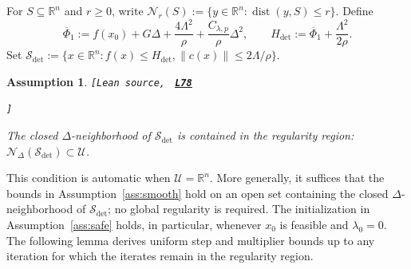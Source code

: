 \documentclass[11pt]{article}
\newtheorem{assumption}[theorem]{Assumption}
\theoremstyle{definition}
\theoremstyle{remark}
\numberwithin{equation}{section}
\numberwithin{figure}{section}
\numberwithin{table}{section}
\numberwithin{algorithm}{section}
\newcommand{\R}{\mathbb{R}}
\newcommand{\norm}[1]{\left\lVert #1\right\rVert}
\newcommand{\leanLinkText}[1]{%
  \underline{\textbf{#1}}%
}
\newcommand{\leanDeclTag}[2]{%
  {\footnotesize\texttt{[Lean source, }}%
  \href{https://github.com/optpku/ReasBook/blob/v4.32.2/ReasBook/Papers/TR_LALM_theory/#1?plain=1\#L#2}%
    {\leanLinkText{\footnotesize\texttt{L#2}}}%
}
\newcommand{\leanDeclTagEnd}{%
  \unskip
  {\footnotesize\texttt{]}}\enspace
}
\begin{document}
For $S\subseteq\R^n$ and $r\ge0$, write
$\mathcal N_r(S):=\{y\in\R^n:\operatorname{dist}(y,S)\le r\}$.
Define
\begin{equation}
    \overline\Phi_1
    :=
    f(x_0)+G\Delta+\frac{4\Lambda^2}{\rho}
    +\frac{C_{\lambda,p}}{\rho}\Delta^2,
    \qquad
    H_{\mathrm{det}}
    :=
    \overline\Phi_1+\frac{\Lambda^2}{2\rho}.
    \label{eq:localizationlevels}
\end{equation}
Set
\(\mathcal S_{\mathrm{det}}
:=\{x\in\R^n:f(x)\le H_{\mathrm{det}},
\norm{c(x)}\le2\Lambda/\rho\}\).

\begin{assumption}
\label{ass:localization}
\leanDeclTag{Assumption_2_5/Region.lean}{78}
\leanDeclTagEnd
The closed $\Delta$-neighborhood of $\mathcal S_{\mathrm{det}}$ is contained in the regularity region:
$\mathcal N_\Delta(\mathcal S_{\mathrm{det}})\subset\mathcal U$.
\end{assumption}

This condition is automatic when $\mathcal U=\R^n$.  More generally, it suffices that the bounds in Assumption~\ref{ass:smooth} hold on an open set containing the closed $\Delta$-neighborhood of $\mathcal S_{\mathrm{det}}$; no global regularity is required. The initialization in Assumption~\ref{ass:safe} holds, in particular, whenever $x_0$ is feasible and $\lambda_0=0$.  The following lemma derives uniform step and multiplier bounds up to any iteration for which the iterates remain in the regularity region.
\end{document}
